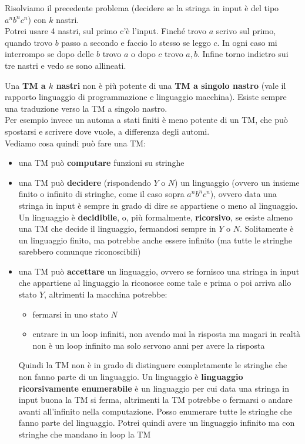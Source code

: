 \documentclass[a4paper,12pt, oneside]{book}
\begin{document}
\begin{esempio}
  Risolviamo il precedente problema (decidere se la stringa in input è del tipo
  $a^nb^nc^n$) con $k$ nastri.\\
  Potrei usare 4 nastri, sul primo c'è l'input. Finché trovo $a$ scrivo sul
  primo, quando trovo $b$ passo a secondo e faccio lo stesso se leggo $c$. In
  ogni caso mi interrompo se dopo delle $b$ trovo $a$ o dopo $c$ trovo
  $a,b$. Infine torno indietro sui tre nastri e vedo se sono allineati.
\end{esempio}
Una \textbf{TM a $k$ nastri} non è più potente di una \textbf{TM a singolo
  nastro} (vale il rapporto linguaggio di programmazione e linguaggio
macchina). Esiste sempre una traduzione verso la TM a singolo nastro.\\
Per esempio invece un automa a stati finiti è meno potente di un TM, che può
spostarsi e scrivere dove vuole, a differenza degli automi.\\
Vediamo cosa quindi può fare una TM:
\begin{itemize}
  \item una TM può \textbf{computare} funzioni su stringhe
  \item una TM può \textbf{decidere} (rispondendo $Y$ o $N$) un linguaggio
  (ovvero un insieme finito o infinito di stringhe, come il caso sopra
  $a^nb^nc^n$), ovvero data una stringa in input è sempre in grado di dire se
  appartiene o meno al linguaggio. Un linguaggio è \textbf{decidibile}, o, più
  formalmente, \textbf{ricorsivo}, se esiste
  almeno una TM che decide il linguaggio, fermandosi sempre in $Y$ o
  $N$. Solitamente è un linguaggio finito, ma potrebbe anche essere infinito (ma
  tutte le stringhe sarebbero comunque riconoscibili)
  \item una TM può \textbf{accettare} un linguaggio, ovvero se fornisco una
  stringa in input che appartiene al linguaggio la riconosce come tale e prima o
  poi arriva allo stato $Y$, altrimenti la macchina potrebbe:
  \begin{itemize}
    \item fermarsi in uno stato $N$
    \item entrare in un loop infiniti, non avendo mai la risposta ma magari in
    realtà non è un loop infinito ma solo servono anni per avere la risposta
  \end{itemize}
  Quindi la TM non è in grado di distinguere completamente le stringhe che non
  fanno parte di un linguaggio. Un linguaggio è \textbf{linguaggio
    ricorsivamente enumerabile} è un linguaggio per cui data una stringa in
  input buona la TM si ferma, altrimenti la TM potrebbe o fermarsi o andare
  avanti all'infinito nella computazione. Posso enumerare tutte le stringhe che
  fanno parte del linguaggio. Potrei quindi avere un linguaggio infinito ma con
  stringhe che mandano in loop la TM
\end{itemize}
\end{document}
